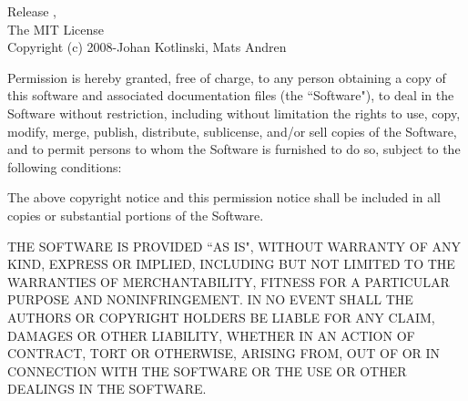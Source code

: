 

\setlength{\parindent}{0pt}

Release \texttt{\revisiontagdoc}, \space \revisiondate\\[18pt]

The MIT License\\

Copyright (c) 2008-\the\year \space Johan Kotlinski, Mats Andren

\begin{flushleft}
Permission is hereby granted, free of charge, to any person obtaining a copy
of this software and associated documentation files (the ``Software"), to deal
in the Software without restriction, including without limitation the rights
to use, copy, modify, merge, publish, distribute, sublicense, and/or sell
copies of the Software, and to permit persons to whom the Software is
furnished to do so, subject to the following conditions:
\end{flushleft}

\begin{flushleft}
The above copyright notice and this permission notice shall be included in
all copies or substantial portions of the Software.
\end{flushleft}

\begin{flushleft}
THE SOFTWARE IS PROVIDED ``AS IS", WITHOUT WARRANTY OF ANY KIND, EXPRESS OR
IMPLIED, INCLUDING BUT NOT LIMITED TO THE WARRANTIES OF MERCHANTABILITY,
FITNESS FOR A PARTICULAR PURPOSE AND NONINFRINGEMENT. IN NO EVENT SHALL THE
AUTHORS OR COPYRIGHT HOLDERS BE LIABLE FOR ANY CLAIM, DAMAGES OR OTHER
LIABILITY, WHETHER IN AN ACTION OF CONTRACT, TORT OR OTHERWISE, ARISING FROM,
OUT OF OR IN CONNECTION WITH THE SOFTWARE OR THE USE OR OTHER DEALINGS IN
THE SOFTWARE.
\end{flushleft}

